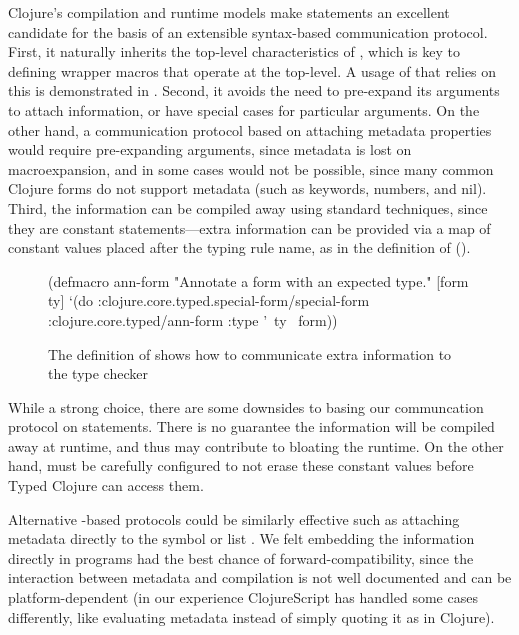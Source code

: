 Clojure's compilation and runtime models make  statements an excellent candidate for the basis of
an extensible syntax-based communication protocol.
First, it naturally inherits the top-level characteristics of , which is key to defining
wrapper macros that operate at the top-level.
A usage of  that relies on this is demonstrated in .
Second, it avoids the need to pre-expand its arguments to attach information, or
have special cases for particular arguments.
On the other hand, a communication protocol based on attaching metadata properties
would require pre-expanding arguments, since metadata is lost on macroexpansion,
and in some cases would not be possible, since many common Clojure forms do not support metadata
(such as keywords, numbers, and nil).
Third, the information can be compiled away using standard techniques,
since they are constant statements---extra information can be provided via a map of constant values
placed after the typing rule name, as in
the definition of  ().

\begin{figure*}
\begin{cljlisting}
(defmacro ann-form
  "Annotate a form with an expected type."
  [form ty]
  `(do :clojure.core.typed.special-form/special-form
       :clojure.core.typed/ann-form
       {:type '~ty}
       ~form))
\end{cljlisting}
  \caption{The definition of  shows how to communicate extra information to the type checker}
  \label{fig:analyzer:ann-form-definition}
\end{figure*}

While a strong choice, there are some downsides to basing our communcation protocol on 
statements.
There is no guarantee the information will be compiled away at runtime, and
thus may contribute to bloating the runtime.
On the other hand,  must be carefully configured to not erase these constant
values before Typed Clojure can access them.

Alternative -based protocols could be similarly effective
such as attaching metadata directly to the symbol  or list .
We felt embedding the information directly in programs had the best chance of forward-compatibility,
since the interaction between metadata and compilation is not well documented and
can be platform-dependent (in our experience ClojureScript has handled some cases differently,
like evaluating metadata instead of simply quoting it as in Clojure).

